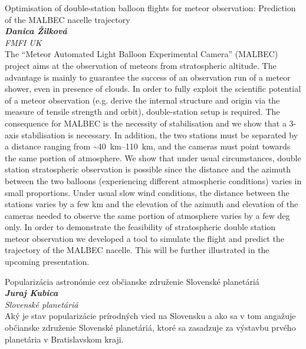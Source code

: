 \documentclass[a4paper]{report}
\begin{document}
                    \begin{tcolorbox}[
                                    colback=white,
                    colframe=black!70!white,
                                fonttitle=\Large\bfseries,
                title=17:00
            ]
                {\Large Optimisation of double-station balloon flights for meteor observation: Prediction of the MALBEC nacelle trajectory}
                                                            \\ \textbf{\textit{Danica Žilková}}
                                                    \\ \textit{FMFI UK}                \\[2ex]The “Meteor Automated Light Balloon Experimental Camera” (MALBEC) project aims at the observation of meteors from stratospheric altitude. The advantage is mainly to guarantee the success of an observation run of a meteor shower, even in presence of clouds. In order to fully exploit the scientific potential of a meteor observation (e.g. derive the internal structure and origin via the measure of tensile strength and orbit), double-station setup is required. The consequence for MALBEC is the necessity of stabilisation and we show that a 3-axis stabilisation is necessary. In addition, the two stations must be separated by a distance ranging from \textasciitilde\SIrange{40}{110}{\kilo\metre}, and the cameras must point towards the same portion of atmosphere. We show that under usual circumstances, double station stratospheric observation is possible since the distance and the azimuth between the two balloons (experiencing different atmospheric conditions) varies in small proportions. Under usual slow wind conditions, the distance between the stations varies by a few km and the elevation of the azimuth and elevation of the cameras needed to observe the same portion of atmosphere varies by a few deg only. In order to demonstrate the feasibility of stratospheric double station meteor observation we developed a tool to simulate the flight and predict the trajectory of the MALBEC nacelle. This will be further illustrated in the upcoming presentation.
            \end{tcolorbox}
                    \begin{tcolorbox}[
                                    colback=white,
                    colframe=black!70!white,
                                fonttitle=\Large\bfseries,
                title=18:00
            ]
                {\Large Popularizácia astronómie cez občianske združenie Slovenské planetáriá}
                                                            \\ \textbf{\textit{Juraj Kubica}}
                                                    \\ \textit{Slovenské planetáriá}                \\[2ex]Aký je stav popularizácie prírodných vied na Slovensku a ako sa v tom angažuje občianske združenie Slovenské planetáriá, ktoré sa zasadzuje za výstavbu prvého planetária v Bratislavskom kraji.
            \end{tcolorbox}
\end{document}
